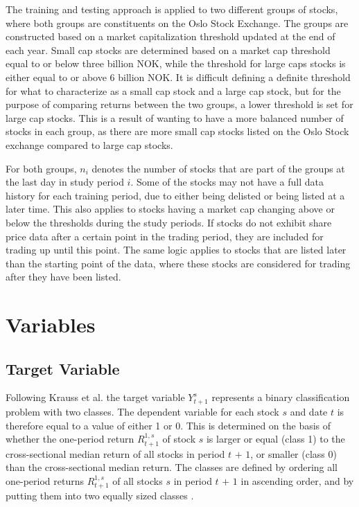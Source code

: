 \indent\newline
The training and testing approach is applied to two different groups of stocks, where both groups are constituents on the Oslo Stock Exchange. The groups are constructed based on a market capitalization threshold updated at the end of each year. Small cap stocks are determined based on a market cap threshold equal to or below three billion NOK, while the threshold for large caps stocks is either equal to or above 6 billion NOK. It is difficult defining a definite threshold for what to characterize as a small cap stock and a large cap stock, but for the purpose of comparing returns between the two groups, a lower threshold is set for large cap stocks. This is a result of wanting to have a more balanced number of stocks in each group, as there are more small cap stocks listed on the Oslo Stock exchange compared to large cap stocks.  

\indent\newline
For both groups, $n_{i}$ denotes the number of stocks that are part of the groups at the last day in study period $\textit{i}$. Some of the stocks may not have a full data history for each training period, due to either being delisted or being listed at a later time. This also applies to stocks having a market cap changing above or below the thresholds during the study periods. If stocks do not exhibit share price data after a certain point in the trading period, they are included for trading up until this point. The same logic applies to stocks that are listed later than the starting point of the data, where these stocks are considered for trading after they have been listed.   

\section{Variables}
\subsection{Target Variable}
Following Krauss et al. the target variable $Y^{s}_{t + 1}$ represents a binary classification problem with two classes. The dependent variable for each stock $\textit{s}$ and date $\textit{t}$ is therefore equal to a value of either 1 or 0. This is determined on the basis of whether the one-period return $R^{1,s}_{t + 1}$ of stock $\textit{s}$ is larger or equal (class 1) to the cross-sectional median return of all stocks in period $\textit{t + 1}$, or smaller (class 0) than the cross-sectional median return. The classes are defined by ordering all one-period returns $R^{1,s}_{t + 1}$ of all stocks $\textit{s}$ in period $\textit{t + 1}$ in ascending order, and by putting them into two equally sized classes \cite{krauss}.  

